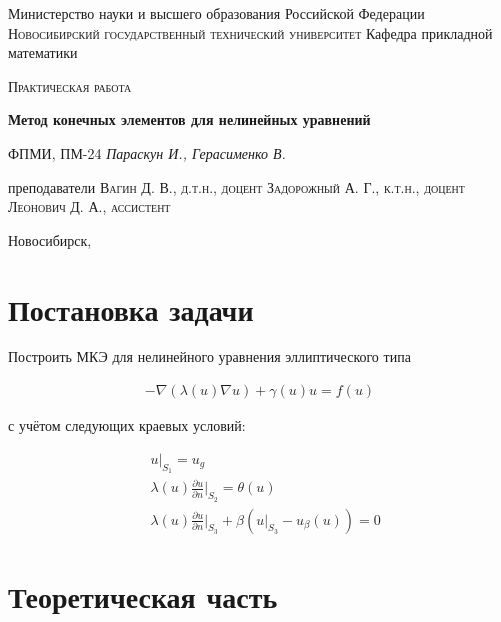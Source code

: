 \documentclass[12pt]{article}
\begin{document}
\begin{titlepage}
\centering

{Министерство науки и высшего образования Российской Федерации}
\vskip 2mm
{\large\scshape Новосибирский государственный технический университет}
\vskip 2mm
{Кафедра прикладной математики}

\vfill
\vskip 3cm

{\scshape Практическая работа }
\vskip 3mm
\begin{spacing}{1.7}
    {\huge\bf Метод конечных элементов для нелинейных уравнений}
\end{spacing}
\vskip 5mm
{\scriptsize ФПМИ, ПМ-24}
\vskip 2mm
{\large\it Параскун И., Герасименко В.}

\vfill

{преподаватели}
\vskip 2mm
{\scshape Вагин Д. В., д.т.н., доцент}
\vskip 1mm
{\scshape Задорожный А. Г., к.т.н., доцент}
\vskip 1mm
{\scshape Леонович Д. А., ассистент}

\vfill

{Новосибирск, \the\year}

\end{titlepage}

\setcounter{page}{2}

\section{Постановка задачи}

\noindent Построить МКЭ для нелинейного уравнения эллиптического типа

\begin{align}
  \label{equation} -\nabla(\lambda(u)\nabla u) + \gamma (u) u = f(u)
\end{align}

\vskip 4mm
\noindent с учётом следующих краевых условий:

\begin{align}
  &u \big|_{S_1} = u_g \\
  &\lambda(u)\frac{\partial u}{\partial n} \big|_{S_2} = \theta(u) \\
  &\lambda(u)\frac{\partial u}{\partial n} \big|_{S_3} +
    \beta(u \big|_{S_3} - u_{\beta}(u)) = 0
\end{align}

\section{Теоретическая часть}
\end{document}
